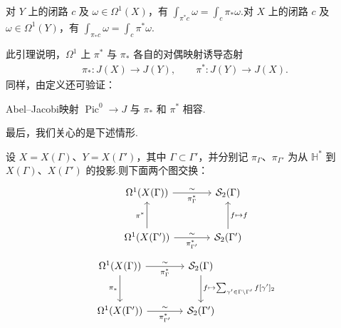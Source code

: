 \begin{lemma*}

对 $Y$ 上的闭路 $c$ 及 $\omega\in\Omega^1(X)$，有 $\int_{\pi^*c}\omega=\int_c\pi_*\omega$.对 $X$ 上的闭路 $c$ 及 $\omega\in\Omega^1(Y)$，有 $\int_{\pi_*c}\omega=\int_c\pi^*\omega$.

\end{lemma*}

此引理说明，$\Omega^1$ 上 $\pi^*$ 与 $\pi_*$ 各自的对偶映射诱导态射
\begin{align*}
\pi_*:J(X)\longrightarrow J(Y),\qquad\pi^*:J(Y)\longrightarrow J(X).
\end{align*}
同样，由定义还可验证：

\begin{lemma*}

Abel--Jacobi映射 $\operatorname{Pic}^0\longrightarrow J$ 与 $\pi_*$ 和 $\pi^*$ 相容.

\end{lemma*}

最后，我们关心的是下述情形.

\begin{lemma*}

设 $X=X(\Gamma)$、$Y=X(\Gamma')$，其中 $\Gamma\subset\Gamma'$，并分别记 $\pi_\Gamma$、$\pi_{\Gamma'}$ 为从 $\mathbb H^*$ 到 $X(\Gamma)$、$X(\Gamma')$ 的投影.则下面两个图交换：
\[
\begin{tikzcd}[column sep=large,row sep=large]
\Omega^1(X(\Gamma)) \arrow[r,"\sim","\pi_\Gamma^*"'] & \mathcal S_2(\Gamma) \\
\Omega^1(X(\Gamma')) \arrow[u,"\pi^*"] \arrow[r,"\sim","\pi_{\Gamma'}^*"'] & \mathcal S_2(\Gamma') \arrow[u,"f\mapsto f"']
\end{tikzcd}
\]
\[
\begin{tikzcd}[column sep=large,row sep=large]
\Omega^1(X(\Gamma)) \arrow[r,"\sim","\pi_\Gamma^*"'] \arrow[d,"\pi_*"'] & \mathcal S_2(\Gamma) \arrow[d,"{f\mapsto\sum_{\gamma'\in\Gamma\backslash\Gamma'}f[\gamma']_2}"] \\
\Omega^1(X(\Gamma')) \arrow[r,"\sim","\pi_{\Gamma'}^*"'] & \mathcal S_2(\Gamma')
\end{tikzcd}
\]
\end{lemma*}

